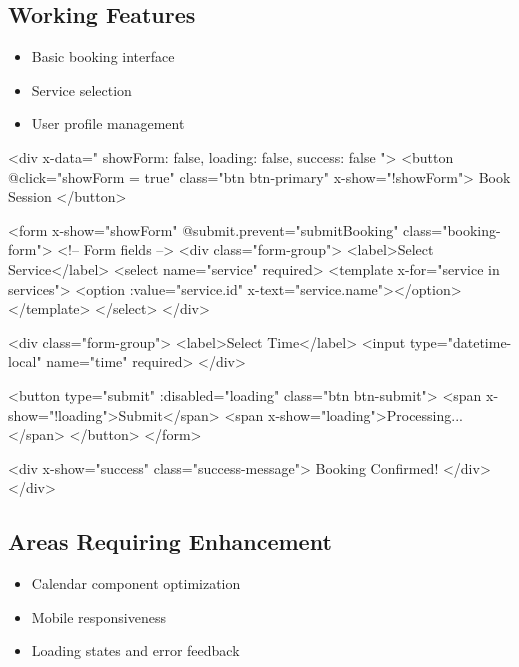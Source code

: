 \subsection{Working Features}
\begin{itemize}
    \item Basic booking interface
    \item Service selection
    \item User profile management
\end{itemize}

\begin{tcolorbox}[
    enhanced,
    title={Example: AlpineJS Component},
    attach boxed title to top left,
    boxed title style={
        colback=primary!50,
        colframe=primary!50,
        arc=0mm,
    },
    colback=white,
    colframe=primary!50,
    arc=0mm,
    fonttitle=\bfseries
]
<div x-data="{ showForm: false, loading: false, success: false }">
    <button 
        @click="showForm = true"
        class="btn btn-primary"
        x-show="!showForm">
        Book Session
    </button>

    <form 
        x-show="showForm"
        @submit.prevent="submitBooking"
        class="booking-form">
        <!-- Form fields -->
        <div class="form-group">
            <label>Select Service</label>
            <select name="service" required>
                <template x-for="service in services">
                    <option :value="service.id" x-text="service.name"></option>
                </template>
            </select>
        </div>
        
        <div class="form-group">
            <label>Select Time</label>
            <input type="datetime-local" name="time" required>
        </div>
        
        <button 
            type="submit"
            :disabled="loading"
            class="btn btn-submit">
            <span x-show="!loading">Submit</span>
            <span x-show="loading">Processing...</span>
        </button>
    </form>

    <div 
        x-show="success"
        class="success-message">
        Booking Confirmed!
    </div>
</div>
\end{tcolorbox}

\subsection{Areas Requiring Enhancement}
\begin{itemize}
    \item Calendar component optimization
    \item Mobile responsiveness
    \item Loading states and error feedback
\end{itemize}

